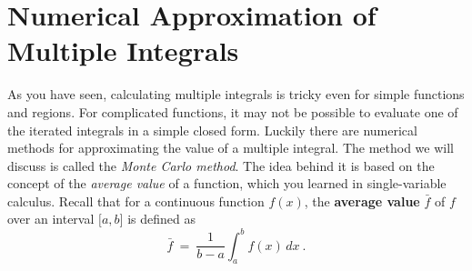 \section{Numerical Approximation of Multiple Integrals}
As you have seen, calculating multiple integrals is tricky even for simple functions and regions. For complicated
functions, it may not be possible to evaluate one of the iterated integrals in a simple closed form. Luckily there
are numerical methods for approximating the value of a multiple integral. The method we will discuss is called the
\emph{Monte Carlo method}. The idea behind it is based on the concept of the \emph{average value} of a function, which
you learned in single-variable calculus. Recall that for a continuous function $f(x)$, the \textbf{average value}
$\bar{f}$ of $f$ over an interval $\lbrack a,b \rbrack$ is defined
as
\begin{equation}\label{eqn:favg}
 \bar{f} ~=~ \frac{1}{b-a}\int_a^b f(x)\,dx ~.
\end{equation}

